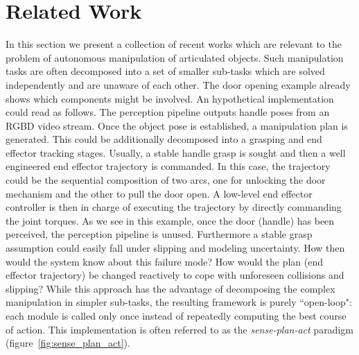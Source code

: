 \section{Related Work}
\label{sec:Related Work}

In this section we present a collection of recent works which are relevant to the problem of autonomous manipulation of articulated objects. Such manipulation tasks are often decomposed into a set of smaller sub-tasks which are solved independently and are unaware of each other. The door opening example already shows which components might be involved. An hypothetical implementation could read as follows. The perception pipeline outputs handle poses from an RGBD video stream. Once the object pose is established, a manipulation plan is generated. This could be additionally decomposed into a grasping and end effector tracking stages. Usually, a stable handle grasp is sought and then a well engineered end effector trajectory is commanded. In this case, the trajectory could be the sequential composition of two arcs, one for unlocking the door mechanism and the other to pull the door open. A low-level end effector controller is then in charge of executing the trajectory by directly commanding the joint torques. As we see in this example, once the door (handle) has been perceived, the perception pipeline is unused. Furthermore a stable grasp assumption could easily fall under slipping and modeling uncertainty. How then would the system know about this failure mode? How would the plan (end effector trajectory) be changed reactively to cope with unforeseen collisions and slipping? While this approach has the advantage of decomposing the complex manipulation in simpler sub-tasks, the resulting framework is purely ``open-loop": each module is called only once instead of repeatedly computing the best course of action. This implementation is often referred to as the \emph{sense-plan-act} paradigm (figure~\ref{fig:sense_plan_act}).     


